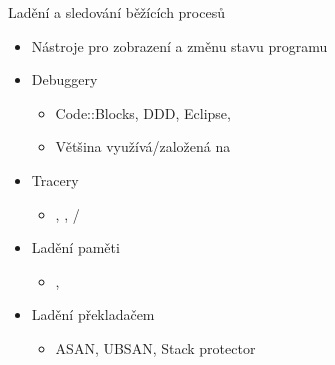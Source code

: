 \begin{frame}{Ladění a sledování běžících procesů}

  \begin{itemize}
    \item Nástroje pro zobrazení a změnu stavu programu

    \pause

    \item Debuggery
    \begin{itemize}
      \item Code::Blocks, DDD, Eclipse, \qtc
      \item Většina využívá/založená na 
    \end{itemize}

    \pause

    \item Tracery
    \begin{itemize}
      \item {}, , /
    \end{itemize}

    \pause

    \item Ladění paměti
    \begin{itemize}
      \item {}, 
    \end{itemize}

    \pause

    \item Ladění překladačem
    \begin{itemize}
      \item ASAN, UBSAN, Stack protector
    \end{itemize}
 \end{itemize}

\end{frame}

\subsection*{}
\frame{\subsectionpage}



\subsection*{}
\frame{\subsectionpage}



